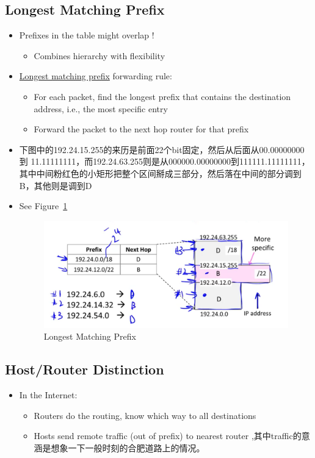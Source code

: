 \documentclass[12pt]{ctexart}   %
\begin{document}
	\subsection{Longest Matching Prefix}
	\begin{itemize}
		\item Prefixes in the table might overlap !
		\begin{itemize}
			\item Combines hierarchy with flexibility
		\end{itemize}
		
		\item \underline{Longest matching prefix} forwarding rule:
		\begin{itemize}
			\item For each packet, find the longest prefix that contains the destination address, i.e., the most specific entry
			\item Forward the packet to the next hop router for that prefix
		\end{itemize}
		\item 下图中的192.24.15.255的来历是前面22个bit固定，然后从后面从00.00000000 到 11.11111111，而192.24.63.255则是从000000.00000000到111111.11111111，其中中间粉红色的小矩形把整个区间掰成三部分，然后落在中间的部分调到B，其他则是调到D
		\item See Figure~\ref{fig:4-5-2}
		
		\begin{figure}[h!] %
		\centering
		 \includegraphics[scale=0.7]{images/4-5-2}
		\caption{Longest Matching Prefix}
		 \label{fig:4-5-2}
		 \end{figure}
		
	\end{itemize}
	
	\subsection{Host/Router Distinction}
	\begin{itemize}
		\item In the Internet:
		\begin{itemize}
			\item Routers do the routing, know which way to all destinations
			\item Hosts send remote traffic (out of prefix) to nearest router ,其中traffic的意涵是想象一下一般时刻的合肥道路上的情况。
		\end{itemize}
	\end{itemize}
	
\end{document}
